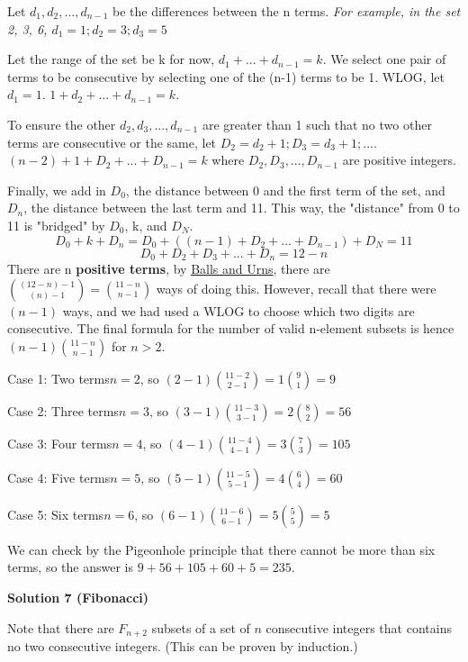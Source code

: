 \begin{enumerate}
{{ Let $d_1, d_2, ..., d_{n-1}$ be the differences between the n terms. \textit{For example, in the set {2, 3, 6}, $d_1 = 1; d_2 = 3; d_3 = 5$}

 Let the range of the set be k for now, $d_1 + ... + d_{n-1} = k$. We select one pair of terms to be consecutive by selecting one of the (n-1) terms to be 1. WLOG, let $d_1 = 1$. $1 + d_2 + ... + d_{n-1} = k$.

 To ensure the other $d_2, d_3, ..., d_{n-1}$ are greater than 1 such that no two other terms are consecutive or the same, let $D_2 = d_2 + 1; D_3 = d_3 + 1; ...$. $(n-2) + 1 + D_2 + ... + D_{n-1} = k$ where $D_2, D_3, ..., D_{n-1}$ are positive integers.

 Finally, we add in $D_0$, the distance between 0 and the first term of the set, and $D_n$, the distance between the last term and 11. This way, the "distance" from 0 to 11 is "bridged" by $D_0$, k, and $D_N$.
 \[D_0 + k + D_n = D_0 + ((n-1) + D_2 + ... + D_{n-1}) + D_N = 11\] 
 \[D_0 + D_2 + D_3 + ... + D_n = 12 - n\]There are n \textbf{positive terms}, by \href{https://artofproblemsolving.com/wiki/index.php?title=Balls\_and\_Urns}{Balls and Urns}, there are ${(12-n)-1 \choose (n)-1} = {11-n \choose n-1}$ ways of doing this. However, recall that there were $(n-1)$ ways, and we had used a WLOG to choose which two digits are consecutive. The final formula for the number of valid n-element subsets is hence $(n-1){11-n \choose n-1}$ for $n > 2$.

 Case 1: Two terms$n = 2$, so $(2-1){11-2 \choose 2-1} = 1{9 \choose 1} = 9$

 Case 2: Three terms$n = 3$, so $(3-1){11-3 \choose 3-1} = 2{8 \choose 2} = 56$

 Case 3: Four terms$n = 4$, so $(4-1){11-4 \choose 4-1} = 3{7 \choose 3} = 105$

 Case 4: Five terms$n = 5$, so $(5-1){11-5 \choose 5-1} = 4{6 \choose 4} = 60$

 Case 5: Six terms$n = 6$, so $(6-1){11-6 \choose 6-1} = 5{5 \choose 5} = 5$

 We can check by the Pigeonhole principle that there cannot be more than six terms, so the answer is $9+56+105+60+5=\boxed{235}$.

 



\textbf{Solution 7 (Fibonacci)}

Note that there are $F_{n+2}$ subsets of a set of $n$ consecutive integers that contains no two consecutive integers. (This can be proven by induction.)

}}
\end{enumerate}
